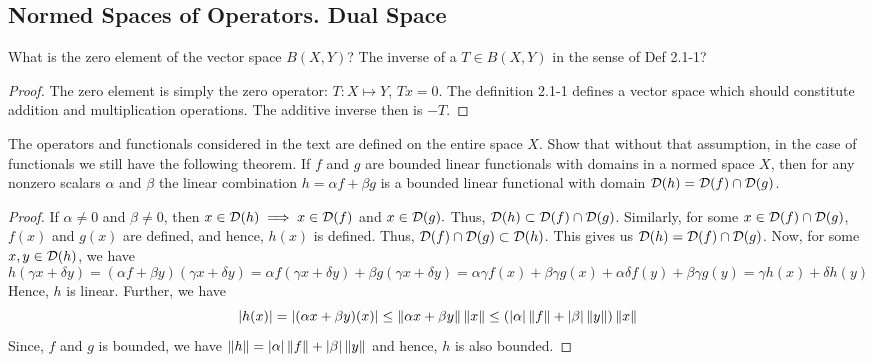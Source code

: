 \subsection{Normed Spaces of Operators. Dual Space}

\begin{question}
    What is the zero element of the vector space $B(X,Y)$? The inverse of a $T \in B(X,Y)$ in the sense of Def 2.1-1?
    \label{section2.10-1}
\end{question}
\begin{proof}
    The zero element is simply the zero operator: $T : X \mapsto Y$, $Tx = 0$. The definition 2.1-1 defines a vector space which should constitute addition and multiplication operations. The additive inverse then is $-T$.
\end{proof}

\begin{question}
    The operators and functionals considered in the text are defined on the entire space $X$. Show that without that assumption, in the case of functionals we still have the following theorem. If $f$ and $g$ are bounded linear functionals with domains in a normed space $X$, then for any nonzero scalars $\alpha$ and $\beta$ the linear combination $h = \alpha f + \beta g$ is a bounded linear functional with domain $\mathcal{D}(h) = \mathcal{D}(f) \cap \mathcal{D}(g)$.
    \label{section2.10-2}
\end{question}
\begin{proof}
    If $\alpha \neq 0$ and $\beta \neq 0$, then $x \in \mathcal{D}(h) \implies x \in \mathcal{D}(f)$ and $x \in \mathcal{D}(g).$ Thus, $\mathcal{D}(h) \subset \mathcal{D}(f) \cap \mathcal{D}(g)$. Similarly, for some $x \in \mathcal{D}(f) \cap \mathcal{D}(g)$, $f(x)$ and $g(x)$ are defined, and hence, $h(x)$ is defined. Thus, $\mathcal{D}(f) \cap \mathcal{D}(g) \subset \mathcal{D}(h)$. This gives us $\mathcal{D}(h) = \mathcal{D}(f) \cap \mathcal{D}(g)$. Now, for some $x , y \in \mathcal{D}(h)$, we have
    \[h(\gamma x + \delta y) = (\alpha f + \beta y)(\gamma x + \delta y) = \alpha f(\gamma x + \delta y) + \beta g(\gamma x + \delta y) = \alpha \gamma f(x) + \beta \gamma g(x) + \alpha \delta f(y) + \beta \gamma g(y) = \gamma h(x) + \delta h(y) \]
    Hence, $h$ is linear. Further, we have
    \[\left\lvert h(x) \right\rvert = \left\lvert (\alpha x + \beta y)(x) \right\rvert \leq \left\lVert \alpha x + \beta y \right\rVert \left\lVert x \right\rVert \leq (\left\lvert \alpha \right\rvert\left\lVert f \right\rVert + \left\lvert \beta \right\rvert \left\lVert y \right\rVert)\left\lVert x \right\rVert\]
    Since, $f$ and $g$ is bounded, we have $\left\lVert h \right\rVert = \left\lvert \alpha \right\rvert\left\lVert f \right\rVert + \left\lvert \beta \right\rvert \left\lVert y \right\rVert$ and hence, $h$ is also bounded.
\end{proof}

